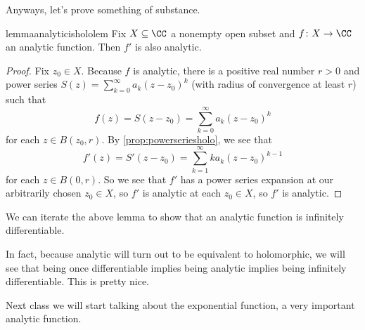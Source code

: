 Anyways, let's prove something of substance.
\begin{restatable}{lemma}{analyticishololem} \label{lem:ddzanaisana}
	Fix $X\subseteq\CC$ a nonempty open subset and $f\colon X\to\CC$ an analytic function. Then $f'$ is also analytic.
\end{restatable}
\begin{proof}
	Fix $z_0\in X$. Because $f$ is analytic, there is a positive real number $r>0$ and power series $S(z)=\sum_{k=0}^\infty a_k(z-z_0)^k$ (with radius of convergence at least $r$) such that
	\[f(z)=S(z-z_0)=\sum_{k=0}^\infty a_k(z-z_0)^k\]
	for each $z\in B(z_0,r)$. By \autoref{prop:powerseriesholo}, we see that
	\[f'(z)=S'(z-z_0)=\sum_{k=1}^\infty ka_k(z-z_0)^{k-1}\]
	for each $z\in B(0,r)$. So we see that $f'$ has a power series expansion at our arbitrarily chosen $z_0\in X$, so $f'$ is analytic at each $z_0\in X$, so $f'$ is analytic.
\end{proof}
\begin{remark}
	We can iterate the above lemma to show that an analytic function is infinitely differentiable.
\end{remark}
\begin{remark}
	In fact, because analytic will turn out to be equivalent to holomorphic, we will see that being once differentiable implies being analytic implies being infinitely differentiable. This is pretty nice.
\end{remark}
Next class we will start talking about the exponential function, a very important analytic function.